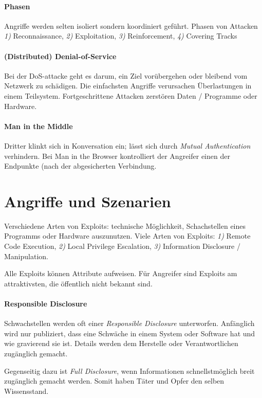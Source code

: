 \documentclass[a4paper,12pt]{article}
\begin{document}
\paragraph{Phasen}
Angriffe werden selten isoliert sondern koordiniert geführt. Phasen von Attacken \emph{1)} Reconnaissance, \emph{2)} Exploitation, \emph{3)} Reinforcement, \emph{4)} Covering Tracks

\paragraph{(Distributed) Denial-of-Service} 
Bei der DoS-attacke geht es darum, ein Ziel vorübergehen oder bleibend vom Netzwerk zu schädigen. Die einfachsten Angriffe verursachen Überlastungen in einem Teilsystem. Fortgeschrittene Attacken zerstören Daten / Programme oder Hardware.

\paragraph{Man in the Middle} Dritter klinkt sich in Konversation ein; lässt sich durch \emph{Mutual Authentication} verhindern. Bei Man in the Browser kontrolliert der Angreifer einen der Endpunkte (nach der abgesicherten Verbindung. 



\newpage
\section{Angriffe und Szenarien}
Verschiedene Arten von Exploits: technische Möglichkeit, Schachstellen eines Programms oder Hardware auszunutzen. Viele Arten von Exploits: \emph{1)} Remote Code Execution, \emph{2)} Local Privilege Escalation, \emph{3)} Information Disclosure / Manipulation.

Alle Exploits können Attribute aufweisen. Für Angreifer sind Exploits am attraktivsten, die öffentlich nicht bekannt sind.


\paragraph{Responsible Disclosure} Schwachstellen werden oft einer \emph{Responsible Disclosure} unterworfen. Anfänglich wird nur publiziert, dass eine Schwäche in einem System oder Software hat und wie gravierend sie ist. Details werden dem Herstelle oder Verantwortlichen zugänglich gemacht.

Gegenseitig dazu ist \emph{Full Disclosure}, wenn Informationen schnellstmöglich breit zugänglich gemacht werden. Somit haben Täter und Opfer den selben Wissensstand.
\end{document}
